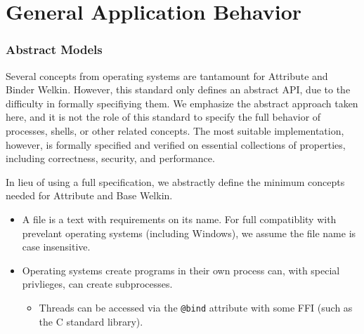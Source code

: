 

\section{General Application Behavior}

\subsubsection*{Abstract Models}

Several concepts from operating systems are tantamount for Attribute and Binder Welkin. However, this standard only defines an abstract API, due to the difficulty in formally specifiying them. We emphasize the abstract approach taken here, and it is not the role of this standard to specify the full behavior of processes, shells, or other related concepts. The most suitable implementation, however, is formally specified and verified on essential collections of properties, including correctness, security, and performance.


In lieu of using a full specification, we abstractly define the minimum concepts needed for Attribute and Base Welkin.
\begin{itemize}
  \item A file is a text with requirements on its name. For full compatiblity with prevelant operating systems (including Windows), we assume the file name is case insensitive.
  \item Operating systems create programs in their own process can, with special privlieges, can create subprocesses.
  \begin{itemize}
  \item Threads can be accessed via the \texttt{@bind} attribute with some FFI (such as the C standard library).
  \end{itemize}
\end{itemize}

